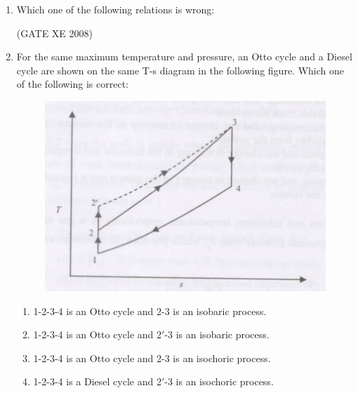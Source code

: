 \documentclass[12pt]{article}
\begin{document}
\begin{enumerate}
\begin{enumerate}
\end{enumerate}

(GATE XE 2008)

\item Which one of the following relations is wrong:  

\begin{enumerate}
\end{enumerate}

(GATE XE 2008)

\item  For the same maximum temperature and pressure, an Otto cycle and a Diesel cycle are shown on the same T-s diagram in the following figure. Which one of the following is correct:  

    \begin{figure}[H]
    \centering
    \includegraphics[width=0.5\columnwidth]{figs/ass1_g_q19.png}
    \caption{}
    \end{figure}
\begin{enumerate}
\item  1-2-3-4 is an Otto cycle and 2-3 is an isobaric process. 
\item  1-2-3-4 is an Otto cycle and 2$'$-3 is an isobaric process. 
\item  1-2-3-4 is an Otto cycle and 2-3 is an isochoric process. 
\item  1-2-3-4 is a Diesel cycle and 2$'$-3 is an isochoric process.
\end{enumerate}


\end{enumerate}
\end{document}
